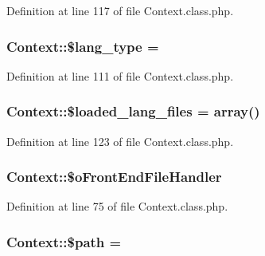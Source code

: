 Definition at line 117 of file Context.\+class.\+php.

\subsubsection[{\texorpdfstring{\$lang\+\_\+type}{$lang_type}}]{\setlength{\rightskip}{0pt plus 5cm}Context\+::\$lang\+\_\+type = \textquotesingle{}\textquotesingle{}}\hypertarget{classContext_a170ac1b95c16b53af329395df9376e9f}{}\label{classContext_a170ac1b95c16b53af329395df9376e9f}


Definition at line 111 of file Context.\+class.\+php.

\subsubsection[{\texorpdfstring{\$loaded\+\_\+lang\+\_\+files}{$loaded_lang_files}}]{\setlength{\rightskip}{0pt plus 5cm}Context\+::\$loaded\+\_\+lang\+\_\+files = array()}\hypertarget{classContext_a0a199fec60b92b21746f1b6e93df01dc}{}\label{classContext_a0a199fec60b92b21746f1b6e93df01dc}


Definition at line 123 of file Context.\+class.\+php.

\subsubsection[{\texorpdfstring{\$o\+Front\+End\+File\+Handler}{$oFrontEndFileHandler}}]{\setlength{\rightskip}{0pt plus 5cm}Context\+::\$o\+Front\+End\+File\+Handler}\hypertarget{classContext_a55e855769152e53af5e2ecb9b889c7f6}{}\label{classContext_a55e855769152e53af5e2ecb9b889c7f6}


Definition at line 75 of file Context.\+class.\+php.

\subsubsection[{\texorpdfstring{\$path}{$path}}]{\setlength{\rightskip}{0pt plus 5cm}Context\+::\$path = \textquotesingle{}\textquotesingle{}}\hypertarget{classContext_a0752e74e1ec01a4fd63c044a1d3bd28b}{}\label{classContext_a0752e74e1ec01a4fd63c044a1d3bd28b}



